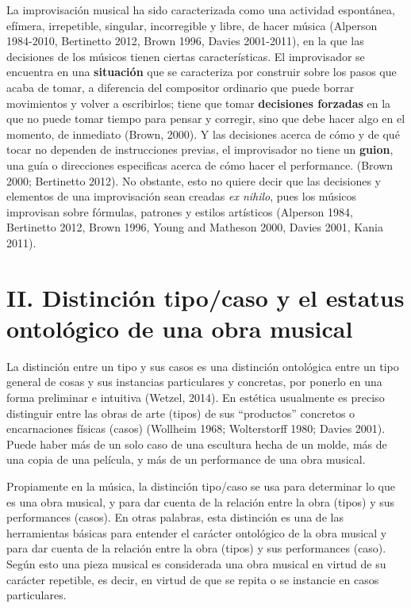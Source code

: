 \documentclass[]{book}
\begin{document}
La improvisación musical ha sido caracterizada como una actividad
espontánea, efímera, irrepetible, singular, incorregible y libre, de
hacer música (Alperson 1984-2010, Bertinetto 2012, Brown 1996, Davies
2001-2011), en la que las decisiones de los músicos tienen ciertas
características. El improvisador se encuentra en una \textbf{situación}
que se caracteriza por construir sobre los pasos que acaba de tomar, a
diferencia del compositor ordinario que puede borrar movimientos y
volver a escribirlos; tiene que tomar \textbf{decisiones forzadas} en la
que no puede tomar tiempo para pensar y corregir, sino que debe hacer
algo en el momento, de inmediato (Brown, 2000). Y las decisiones acerca
de cómo y de qué tocar no dependen de instrucciones previas, el
improvisador no tiene un \textbf{guion}, una guía o direcciones
especificas acerca de cómo hacer el performance. (Brown 2000; Bertinetto
2012). No obstante, esto no quiere decir que las decisiones y elementos
de una improvisación sean creadas \emph{ex nihilo}, pues los músicos
improvisan sobre fórmulas, patrones y estilos artísticos (Alperson 1984,
Bertinetto 2012, Brown 1996, Young and Matheson 2000, Davies 2001, Kania
2011).

\section*{II. Distinción tipo/caso y el estatus ontológico de una obra
  musical}


La distinción entre un tipo y sus casos es una distinción ontológica
entre un tipo general de cosas y sus instancias particulares y
concretas, por ponerlo en una forma preliminar e intuitiva (Wetzel,
2014). En estética usualmente es preciso distinguir entre las obras de
arte (tipos) de sus ``productos'' concretos o encarnaciones físicas
(casos) (Wollheim 1968; Wolterstorff 1980; Davies 2001). Puede haber más
de un solo caso de una escultura hecha de un molde, más de una copia de
una película, y más de un performance de una obra musical.

Propiamente en la música, la distinción tipo/caso se usa para determinar
lo que es una obra musical, y para dar cuenta de la relación entre la
obra (tipos) y sus performances (casos). En otras palabras, esta
distinción es una de las herramientas básicas para entender el carácter
ontológico de la obra musical y para dar cuenta de la relación entre la
obra (tipos) y sus performances (caso). Según esto una pieza musical es
considerada una obra musical en virtud de su carácter repetible, es
decir, en virtud de que se repita o se instancie en casos particulares.
\end{document}

